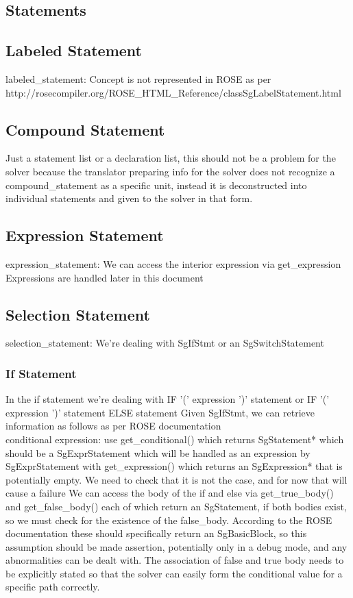 \documentclass[11pt]{article}
\begin{document}
{\begin{enumeration}
\section{Statements}
\subsection{Labeled Statement}
labeled\_statement:
Concept is not represented in ROSE as per\\
http://rosecompiler.org/ROSE\_HTML\_Reference/classSgLabelStatement.html\\
\subsection{Compound Statement}
Just a statement list or a declaration list, this should not be a problem for the solver because the translator preparing info for the solver does not recognize a compound\_statement as a specific unit, instead it is deconstructed into individual statements and given to the solver in that form.\\
\subsection{Expression Statement}
expression\_statement:
We can access the interior expression via
get\_expression
Expressions are handled later in this document
\subsection{Selection Statement}
selection\_statement:
We're dealing with SgIfStmt or an SgSwitchStatement
\subsubsection{If Statement}
In the if statement we're dealing with 
IF '(' expression ')' statement
or
IF '(' expression ')' statement ELSE statement
Given SgIfStmt, we can retrieve information as follows as per ROSE documentation\\
conditional expression: use
get\_conditional()
which returns SgStatement* which should be a SgExprStatement which will be handled as an expression by SgExprStatement with
get\_expression()
which returns an SgExpression* that is potentially empty. We need to check that it is not the case, and for now that will cause a failure
We can access the body of the if and else via
get\_true\_body()
and
get\_false\_body()
each of which return an SgStatement, if both bodies exist, so we must check for the existence of the false\_body. According to the ROSE documentation these should specifically return an SgBasicBlock, so this assumption should be made assertion, potentially only in a debug mode, and any abnormalities can be dealt with. The association of false and true body needs to be explicitly stated so that the solver can easily form the conditional value for a specific path correctly.

\end{enumeration}}
\end{document}
